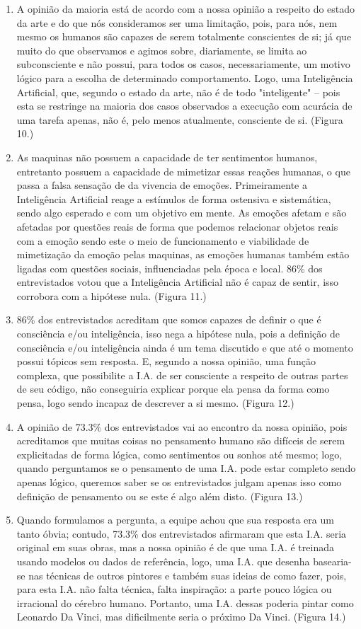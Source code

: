 \documentclass[onecolumn,12pt]{asme2ej}
\begin{document}
\begin{enumerate}
  \item A opinião da maioria está de acordo com a nossa opinião a respeito do estado da arte e do que nós consideramos ser uma limitação, pois, para nós, nem mesmo os humanos são capazes de serem totalmente conscientes de si; já que muito do que observamos e agimos sobre, diariamente, se limita ao subconsciente e não possui, para todos os casos, necessariamente, um motivo lógico para a escolha de determinado comportamento. Logo, uma Inteligência Artificial, que, segundo o estado da arte, não é de todo "inteligente" -- pois esta se restringe na maioria dos casos observados a execução com acurácia de uma tarefa apenas, não é, pelo menos atualmente, consciente de si. (Figura 10.)
  \item As maquinas não possuem a capacidade de ter sentimentos humanos, entretanto possuem a capacidade de mimetizar essas reações humanas, o que passa a falsa sensação de da vivencia de emoções. Primeiramente a Inteligência Artificial reage a estímulos de forma ostensiva e sistemática, sendo algo esperado e com um objetivo em mente. As emoções afetam e são afetadas por questões reais de forma que podemos relacionar objetos reais com a emoção sendo este o meio de funcionamento e viabilidade de mimetização da emoção pelas maquinas, as emoções humanas também estão ligadas com questões sociais, influenciadas pela época e local. 86\% dos entrevistados votou que a Inteligência Artificial não é capaz de sentir, isso corrobora com a hipótese nula. (Figura 11.)
  \item 86\% dos entrevistados acreditam que somos capazes de definir o que é consciência e/ou inteligência, isso nega a hipótese nula, pois a definição de consciência e/ou inteligência ainda é um tema discutido e que até o momento possui tópicos sem resposta. E, segundo a nossa opinião, uma função complexa, que possibilite a I.A. de ser consciente a respeito de outras partes de seu código, não conseguiria explicar porque ela pensa da forma como pensa, logo sendo incapaz de descrever a si mesmo. (Figura 12.) 
  \item  A opinião de 73.3\% dos entrevistados vai ao encontro da nossa opinião, pois acreditamos que muitas coisas no pensamento humano são difíceis de serem explicitadas de forma lógica, como sentimentos ou sonhos até mesmo; logo, quando perguntamos se o pensamento de uma I.A. pode estar completo sendo apenas lógico, queremos saber se os entrevistados julgam apenas isso como definição de pensamento ou se este é algo além disto. (Figura 13.)
  \item  Quando formulamos a pergunta, a equipe achou que sua resposta era um tanto óbvia; contudo, 73.3\% dos entrevistados afirmaram que esta I.A. seria original em suas obras, mas a nossa opinião é de que uma I.A. é treinada usando modelos ou dados de referência, logo, uma I.A. que desenha basearia-se nas técnicas de outros pintores e também suas ideias de como fazer, pois, para esta I.A. não falta técnica, falta inspiração: a parte pouco lógica ou irracional do cérebro humano. Portanto, uma I.A. dessas poderia pintar como Leonardo Da Vinci, mas dificilmente seria o próximo Da Vinci. (Figura 14.)
\end{enumerate}
\end{document}
